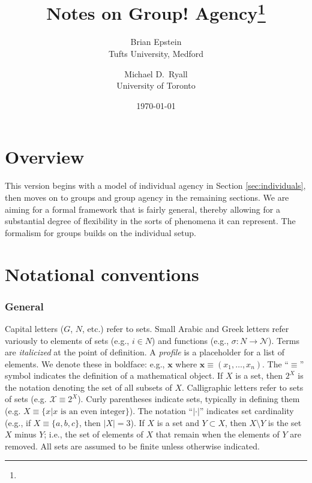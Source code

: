 \documentclass[
11pt,
titlepage,
reqno,
]{article}%
\theoremstyle{definition}
\begin{document}
	
	\title{Notes on Group! Agency\thanks{}
	}
	\author
	{
		Brian Epstein \\Tufts University, Medford
		\and 
		Michael D.\ Ryall \\University of Toronto 
	}
	\date{\today}
	\maketitle
	
	
	
	\def\baselinestretch{1.5}\small\normalsize
	
	\newpage
	\section{Overview}

	This version begins with a model of individual agency in Section \ref{sec:individuals}, then moves on to groups and group agency in the remaining sections. 
	We are aiming for a  formal framework that is fairly general, thereby allowing for a substantial degree of flexibility in the sorts of phenomena it can represent.  
	The formalism for groups builds on the individual setup. 
	
	\section{Notational conventions}
	\subsubsection{General}
	Capital letters ($G$, $N$, etc.) refer to sets.  
	Small Arabic and Greek letters refer variously to elements of sets (e.g., $i\in N$) and functions (e.g., $\sigma:N\rightarrow \mathcal{N}$). 
	Terms  are \textit{italicized} at the point of definition.  
	A \textit{profile} is a placeholder for a list of elements.
	We denote these in boldface: e.g., $\mathbf{x}$ where $\mathbf{x}\equiv(x_1,\ldots,x_n)$. 
	The ``$\equiv$'' symbol indicates the definition of a mathematical object. 
	If $X$ is a set, then $2^X$ is the notation denoting the set of all subsets of $X$. Calligraphic letters refer to sets of sets (e.g. $\mathcal{X}\equiv 2^X$). 
	Curly parentheses indicate sets, typically in defining them (e.g. $X\equiv\{x|x\text{ is an even integer}\}$). 
	The notation ``$|\cdot|$'' indicates set cardinality (e.g., if $X\equiv\{a,b,c\}$, then $|X|=3$). 
	If $X$ is a set and $Y\subset X$, then $X\setminus Y$ is the set $X$ minus $Y$; i.e., the set of elements of $X$ that  remain when the elements of $Y$ are removed. 
	All sets are assumed to be finite unless otherwise indicated.
\end{document}
